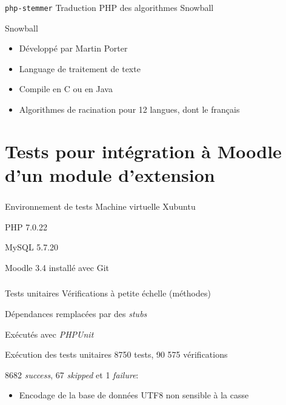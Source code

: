 \documentclass{beamer}
\begin{document}
  \begin{frame}
    \frametitle{\insertsection}
    \begin{block}{\texttt{php-stemmer}}
      Traduction PHP des algorithmes Snowball
    \end{block}
  
    \vfill
  
    \begin{block}{Snowball}
      \begin{itemize}
        \item D\'evelopp\'e par Martin Porter
        \item Language de traitement de texte
        \item Compile en C ou en Java
        \item Algorithmes de racination pour 12 langues, dont le fran\c{c}ais
      \end{itemize}
    \end{block}
    \vfill
  \end{frame}
  
  \section[Tests]{Tests pour int\'egration \`a Moodle d'un module d'extension}
  \begin{frame}
    \frametitle{\insertsection}
    \begin{block}{Environnement de tests}
      Machine virtuelle Xubuntu
      \smallskip

      PHP 7.0.22 
      \smallskip
      
      MySQL 5.7.20
      \smallskip

      Moodle 3.4 install\'e avec Git
    \end{block}
  \end{frame}
  
  \begin{frame}
    \frametitle{\insertsection}
    \begin{block}{Tests unitaires}
      V\'erifications \`a petite \'echelle (m\'ethodes)
  
      D\'ependances remplac\'ees par des \textit{stubs}
  
      Ex\'ecut\'es avec \textit{PHPUnit}
    \end{block}
  
    \vfill
  
    \begin{block}{Ex\'ecution des tests unitaires}
      8750 tests, 90 575 v\'erifications
      \medskip

      8682 \textit{success}, 67 \textit{skipped} et 1 \textit{failure}:
      \begin{itemize}
        \item Encodage de la base de donn\'ees UTF8 non sensible \`a la casse
      \end{itemize}
    \end{block}
  \end{frame}
  
\end{document}
